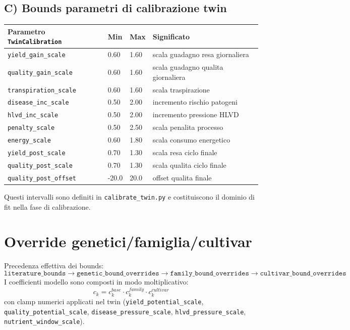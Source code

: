﻿\documentclass[11pt,a4paper]{report}
\begin{document}
\subsection*{C) Bounds parametri di calibrazione twin}
\begin{longtable}{@{}p{4.4cm}p{2.0cm}p{2.0cm}p{4.4cm}@{}}
\toprule
Parametro \texttt{TwinCalibration} & Min & Max & Significato \\ \midrule
\texttt{yield\_gain\_scale} & 0.60 & 1.60 & scala guadagno resa giornaliera \\
\texttt{quality\_gain\_scale} & 0.60 & 1.60 & scala guadagno qualita giornaliera \\
\texttt{transpiration\_scale} & 0.60 & 1.60 & scala traspirazione \\
\texttt{disease\_inc\_scale} & 0.50 & 2.00 & incremento rischio patogeni \\
\texttt{hlvd\_inc\_scale} & 0.50 & 2.00 & incremento pressione HLVD \\
\texttt{penalty\_scale} & 0.50 & 2.50 & scala penalita processo \\
\texttt{energy\_scale} & 0.60 & 1.80 & scala consumo energetico \\
\texttt{yield\_post\_scale} & 0.70 & 1.30 & scala resa ciclo finale \\
\texttt{quality\_post\_scale} & 0.70 & 1.30 & scala qualita ciclo finale \\
\texttt{quality\_post\_offset} & -20.0 & 20.0 & offset qualita finale \\
\bottomrule
\end{longtable}
Questi intervalli sono definiti in \texttt{calibrate\_twin.py} e costituiscono il dominio di fit nella fase di calibrazione.

\section{Override genetici/famiglia/cultivar}
Precedenza effettiva dei bounds:
\[
\texttt{literature\_bounds} \rightarrow \texttt{genetic\_bound\_overrides} \rightarrow \texttt{family\_bound\_overrides} \rightarrow \texttt{cultivar\_bound\_overrides}
\]
I coefficienti modello sono composti in modo moltiplicativo:
\[
c_k = c^{base}_k \cdot c^{family}_k \cdot c^{cultivar}_k
\]
con clamp numerici applicati nel twin (\texttt{yield\_potential\_scale}, \texttt{quality\_potential\_scale}, \texttt{disease\_pressure\_scale}, \texttt{hlvd\_pressure\_scale}, \texttt{nutrient\_window\_scale}).
\end{document}
